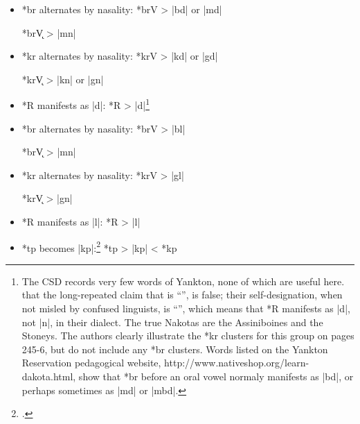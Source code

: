 \documentclass[output=paper]{LSP/langsci}
\begin{document}

\begin{itemize}
\item *br alternates by nasality: \hspace{1em} *brV	>	|bd| or |md|

\hspace{12em} *br\k{V} 	>	|mn|
\item  *kr alternates by nasality:  \hspace{1.2em} *krV       >          |kd| or |gd|

\hspace{12em} *kr\k{V} 	>	|kn| or |gn|

\item *R manifests as |d|: \hspace{4.5em} *R	>	|d|\footnote{The CSD records very few words of Yankton, none of which are useful here.  \citet{ParksDeMallie1992}  that the long-repeated claim that  is ``'', is false; their self-designation, when not misled by confused linguists, is ``'', which means that *R manifests as |d|, not |n|, in their dialect.  The true Nakotas are the Assiniboines and the Stoneys.  The authors clearly illustrate the *kr clusters for this group on pages 245-6, but do not include any *br clusters.  Words listed on the Yankton Reservation pedagogical website, http://www.nativeshop.org/learn-dakota.html, show that *br before an oral vowel normaly manifests as |bd|, or perhaps sometimes as |md| or |mbd|.}
\end{itemize}


\begin{itemize}
\item  *br alternates by nasality:  \hspace{1em} *brV	>	|bl|

\hspace{12em} *br\k{V}	>	|mn|

\item  *kr alternates by nasality: \hspace{1em}   *krV       >          |gl|

\hspace{12em} *kr\k{V}	>	|gn|
\item *R manifests as |l|: \hspace{4.5em} *R	>	|l|
\item *tp becomes |kp|:\footnote{\citealt[253, 265, 865]{Rankinetal2006PDF}.} \hspace{4.5em} *tp	>	|kp|	 <	*kp
 \end{itemize}
 
\end{document}
